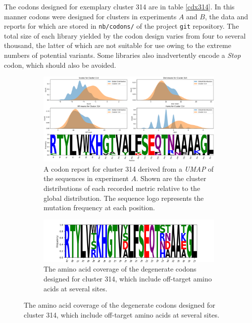 \documentclass[16pt]{article}
\begin{document}
The codons designed for exemplary cluster 314 are in table \ref{cdx314}.
In this manner codons were designed for clusters in experiments $A$ and $B$, the data and reports for which are stored in \texttt{nb/codons/} of the project \texttt{git}  repository.
The total size of each library yielded by the codon design varies from four to several thousand, the latter of which are not suitable for use owing to the extreme numbers of potential variants.
Some libraries also inadvertently encode a \textit{Stop} codon, which should also be avoided.


\begin{figure}
\begin{subfigure}{\textwidth}
	\includegraphics[width=\textwidth]{img/clus_314.png}
	\caption{\label{cdxreport} A codon report for cluster 314 derived from a \textit{UMAP} of the sequences in experiment $A$.
		 Shown are the cluster distributions of each recorded metric relative to the global distribution.
		 The sequence logo represents the mutation frequency at each position.}
\end{subfigure}
\begin{subfigure}{\textwidth}
	\includegraphics[width=\textwidth]{img/clus_314-codon-coverage.png}
	\caption{\label{cdxreportcoverage} The amino acid coverage of the degenerate codons designed for cluster 314, which include off-target amino acids at several sites.}
\end{subfigure}
\end{figure}

\end{document}
